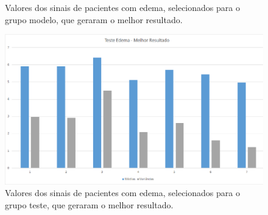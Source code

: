 \documentclass[a4paper,12pt,oneside]{report}
\begin{document}
\begin{appendices}
\begin{figure}
\caption{Valores dos sinais de pacientes com edema, selecionados para o grupo modelo, que geraram o melhor resultado. }
\label{fig:edema_modelo_melhor}
\end{figure}
\begin{figure}
\centering
\includegraphics[width=0.70\hsize]{figuras_tcc/melhor_resultado/teste_edema_melhor.eps}
\caption{Valores dos sinais de pacientes com edema, selecionados para o grupo teste, que geraram o melhor resultado. }
\label{fig:edema_teste_melhor}
\end{figure}
\end{appendices}
\end{document}
